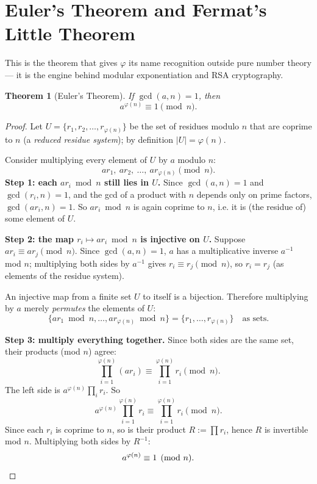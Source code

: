 \documentclass[11pt]{article}
\newtheorem{theorem}{Theorem}[section]
\theoremstyle{definition}
\theoremstyle{remark}
\begin{document}
\section{Euler's Theorem and Fermat's Little Theorem}

This is the theorem that gives $\varphi$ its name recognition outside pure number theory — it is the engine behind modular exponentiation and RSA cryptography.

\begin{theorem}[Euler's Theorem]\label{thm:euler}
If $\gcd(a,n) = 1$, then
\[
a^{\varphi(n)} \equiv 1 \pmod n.
\]
\end{theorem}

\begin{proof}
Let $U = \{ r_1, r_2, \dots, r_{\varphi(n)} \}$ be the set of residues modulo $n$ that are coprime to $n$ (a \emph{reduced residue system}); by definition $|U| = \varphi(n)$.

Consider multiplying every element of $U$ by $a$ modulo $n$:
\[
a r_1,\ a r_2,\ \dots,\ a r_{\varphi(n)} \pmod n.
\]
\textbf{Step 1: each $ar_i \bmod n$ still lies in $U$.} Since $\gcd(a,n)=1$ and $\gcd(r_i, n) = 1$, and the gcd of a product with $n$ depends only on prime factors, $\gcd(a r_i, n) = 1$. So $ar_i \bmod n$ is again coprime to $n$, i.e. it is (the residue of) some element of $U$.

\textbf{Step 2: the map $r_i \mapsto a r_i \bmod n$ is injective on $U$.} Suppose $a r_i \equiv a r_j \pmod n$. Since $\gcd(a,n)=1$, $a$ has a multiplicative inverse $a^{-1}$ mod $n$; multiplying both sides by $a^{-1}$ gives $r_i \equiv r_j \pmod n$, so $r_i = r_j$ (as elements of the residue system).

An injective map from a finite set $U$ to itself is a bijection. Therefore multiplying by $a$ merely \emph{permutes} the elements of $U$:
\[
\{ a r_1 \bmod n, \dots, a r_{\varphi(n)} \bmod n \} = \{ r_1, \dots, r_{\varphi(n)} \} \quad \text{as sets.}
\]

\textbf{Step 3: multiply everything together.} Since both sides are the same set, their products (mod $n$) agree:
\[
\prod_{i=1}^{\varphi(n)} (a r_i) \equiv \prod_{i=1}^{\varphi(n)} r_i \pmod n.
\]
The left side is $a^{\varphi(n)} \prod_i r_i$. So
\[
a^{\varphi(n)} \prod_{i=1}^{\varphi(n)} r_i \equiv \prod_{i=1}^{\varphi(n)} r_i \pmod n.
\]
Since each $r_i$ is coprime to $n$, so is their product $R := \prod r_i$, hence $R$ is invertible mod $n$. Multiplying both sides by $R^{-1}$:
\[
a^{\varphi(n)} \equiv 1 \pmod n. \qedhere
\]
\end{proof}
\end{document}
